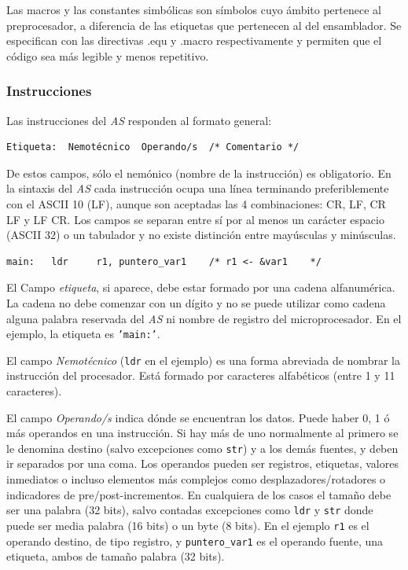 Las macros y las constantes simbólicas son símbolos cuyo ámbito pertenece al preprocesador,
a diferencia de las etiquetas que pertenecen al del ensamblador. Se especifican con las
directivas .equ y .macro respectivamente y permiten que el código sea más legible y menos
repetitivo.

\subsubsection{Instrucciones}

Las instrucciones del {\it AS} responden al formato general:


\begin{lstlisting}
Etiqueta:  Nemotécnico  Operando/s  /* Comentario */
\end{lstlisting}

De estos campos, sólo el nemónico (nombre de la instrucción) es obligatorio. En
la sintaxis del {\it AS} cada instrucción ocupa una línea terminando preferiblemente
con el ASCII 10 (LF), aunque son aceptadas las 4 combinaciones: CR, LF, CR LF y LF CR.
Los campos se separan entre sí por al menos un carácter espacio (ASCII 32) o un tabulador
y no existe distinción entre mayúsculas y minúsculas.

\begin{lstlisting}
main:   ldr     r1, puntero_var1    /* r1 <- &var1    */
\end{lstlisting}

El Campo {\it etiqueta}, si aparece, debe estar formado por una
cadena alfanumérica. La cadena no debe comenzar con un dígito y no se puede
utilizar como cadena alguna palabra reservada del {\it AS} ni nombre
de registro del microprocesador. En el ejemplo, la etiqueta es
{\tt 'main:'}.

El campo \textit{Nemotécnico} ({\tt ldr} en el ejemplo) es una forma
abreviada de nombrar la instrucción del procesador.
Está formado por caracteres alfabéticos (entre 1 y 11 caracteres).

El campo \textit{Operando/s} indica dónde se encuentran los datos.
Puede haber 0, 1 ó más operandos en una instrucción. Si hay más de uno
normalmente al primero se le denomina destino (salvo excepciones como {\tt str})
y a los demás fuentes, y deben ir separados por una coma.
Los operandos pueden ser registros, etiquetas, valores inmediatos o incluso
elementos más complejos como desplazadores/rotadores o indicadores de
pre/post-incrementos. En cualquiera de los casos el tamaño debe ser una
palabra (32 bits), salvo contadas excepciones como {\tt ldr} y {\tt str}
donde puede ser media palabra (16 bits) o un byte (8 bits).
En el ejemplo {\tt r1} es el operando destino, de tipo registro,
y {\tt puntero_var1} es el operando fuente, una etiqueta, ambos
de tamaño palabra (32 bits).

